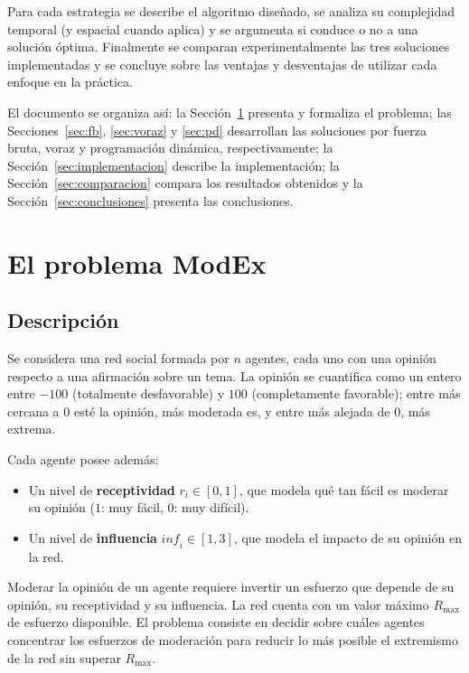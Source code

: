 \documentclass[11pt,letterpaper]{article}
\newcommand{\Rmax}{R_{\max}}
\begin{document}
Para cada estrategia se describe el algoritmo diseñado, se analiza su
complejidad temporal (y espacial cuando aplica) y se argumenta si conduce o no
a una solución óptima. Finalmente se comparan experimentalmente las tres
soluciones implementadas y se concluye sobre las ventajas y desventajas de
utilizar cada enfoque en la práctica.

El documento se organiza así: la Sección~\ref{sec:problema} presenta y
formaliza el problema; las Secciones~\ref{sec:fb}, \ref{sec:voraz} y
\ref{sec:pd} desarrollan las soluciones por fuerza bruta, voraz y programación
dinámica, respectivamente; la Sección~\ref{sec:implementacion} describe la
implementación; la Sección~\ref{sec:comparacion} compara los resultados
obtenidos y la Sección~\ref{sec:conclusiones} presenta las conclusiones.

\section{El problema ModEx}
\label{sec:problema}

\subsection{Descripción}

Se considera una red social formada por $n$ agentes, cada uno con una opinión
respecto a una afirmación sobre un tema. La opinión se cuantifica como un
entero entre $-100$ (totalmente desfavorable) y $100$ (completamente
favorable); entre más cercana a $0$ esté la opinión, más moderada es, y entre
más alejada de $0$, más extrema.

Cada agente posee además:
\begin{itemize}
  \item Un nivel de \textbf{receptividad} $r_i \in [0,1]$, que modela qué tan
        fácil es moderar su opinión ($1$: muy fácil, $0$: muy difícil).
  \item Un nivel de \textbf{influencia} $\mathit{inf}_i \in [1,3]$, que modela el
        impacto de su opinión en la red.
\end{itemize}

Moderar la opinión de un agente requiere invertir un esfuerzo que depende de
su opinión, su receptividad y su influencia. La red cuenta con un valor
máximo $\Rmax$ de esfuerzo disponible. El problema consiste en decidir sobre
cuáles agentes concentrar los esfuerzos de moderación para reducir lo más
posible el extremismo de la red sin superar $\Rmax$.
\end{document}
